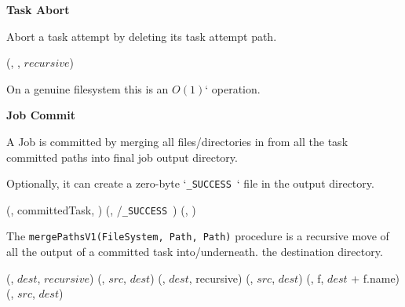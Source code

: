 \documentclass[conference]{IEEEtran}
\newcommand{\SUCCESS}{\texttt{\_SUCCESS}\ }
\begin{document}
\textbf{Task Abort}

Abort a task attempt by deleting its task attempt path.

\begin{procedure}
\FileOutputCommitVars

  \delete(\fs, \taskAttemptPath, $recursive$)\;

\caption{abortTask()}
\label{alg:FileOutputCommitter.abortTask}
\end{procedure}


On a genuine filesystem this is an $O(1)$` operation.

\textbf{Job Commit}

A Job is committed by merging all files/directories in from all the task
committed paths into final job output directory.

Optionally, it can create a zero-byte `\SUCCESS` file in the output directory.

\begin{procedure*}
\FileOutputCommitVars

   {
    \mergePathsA(\fs, committedTask, \dest)\;
  }
  \touch(\fs, \dest/\SUCCESS)\;
  \delete(\fs, \temp)\;

\caption{commitJob()}
\label{alg:FileOutputCommitter.commitJob}
\end{procedure*}


The \texttt{mergePathsV1(FileSystem, Path, Path)} procedure is
a recursive move of all the output of a committed task into/underneath.
the destination directory.

\begin{procedure*}
\FileOutputCommitVars

   {
     {
      \delete(\fs, $dest$, $recursive$)\;
    }
    \rename(\fs, $src$, $dest$)\;
  } {
     {
       {
        \delete(\fs, $dest$, recursive)\;
        \rename(\fs, $src$, $dest$)\;
      } {
         {
         \mergePathsA(\fs, f, $dest$ + f.name)\;
        }
      }
    } {
      \rename(\fs, $src$, $dest$)\;
    }
  }

\caption{mergePathsV1(fs, src, dest)}
\label{alg:mergePathsV1}
\end{procedure*}
\end{document}
